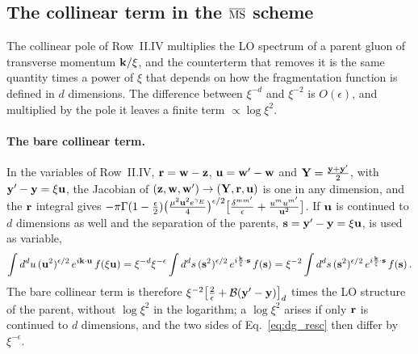 \subsection{The collinear term in the \texorpdfstring{$\overline{\rm MS}$}{MS-bar} scheme}\label{sec:dg_msbar}

The collinear pole of Row~II.IV multiplies the LO spectrum of a parent gluon of transverse momentum $\mathbf{k}/\xi$, and the counterterm that removes it is the same quantity times a power of $\xi$ that depends on how the fragmentation function is defined in $d$ dimensions. The difference between $\xi^{-d}$ and $\xi^{-2}$ is $O(\epsilon)$, and multiplied by the pole it leaves a finite term $\propto\log\xi^2$.

\paragraph{The bare collinear term.} In the variables of Row~II.IV, $\mathbf{r}=\mathbf{w}-\mathbf{z}$, $\mathbf{u}=\mathbf{w}'-\mathbf{w}$ and $\mathbf{Y}=\frac{\mathbf{y}+\mathbf{y}'}{2}$, with $\mathbf{y}'-\mathbf{y}=\xi\mathbf{u}$, the Jacobian of $(\mathbf{z},\mathbf{w},\mathbf{w}')\to(\mathbf{Y},\mathbf{r},\mathbf{u})$ is one in any dimension, and the $\mathbf{r}$ integral gives $-\pi\Gamma(1-\frac\epsilon2)\big(\frac{\mu^2\mathbf{u}^2e^{\gamma_E}}{4}\big)^{\epsilon/2}\big[\frac{\delta^{mm'}}{\epsilon}+\frac{u^mu^{m'}}{\mathbf{u}^2}\big]$. If $\mathbf{u}$ is continued to $d$ dimensions as well and the separation of the parents, $\mathbf{s}=\mathbf{y}'-\mathbf{y}=\xi\mathbf{u}$, is used as variable,
\begin{align}\label{eq:dg_resc}
\int d^du\,(\mathbf{u}^2)^{\epsilon/2}\,e^{i\mathbf{k}\cdot\mathbf{u}}\,f(\xi\mathbf{u})=\xi^{-d}\xi^{-\epsilon}\int d^ds\,(\mathbf{s}^2)^{\epsilon/2}\,e^{i\frac{\mathbf{k}}{\xi}\cdot\mathbf{s}}\,f(\mathbf{s})=\xi^{-2}\int d^ds\,(\mathbf{s}^2)^{\epsilon/2}\,e^{i\frac{\mathbf{k}}{\xi}\cdot\mathbf{s}}\,f(\mathbf{s})\,.
\end{align}
The bare collinear term is therefore $\xi^{-2}\big[\frac2\epsilon+\mathcal B(\mathbf{y}'-\mathbf{y})\big]_d$ times the LO structure of the parent, without $\log\xi^2$ in the logarithm; a $\log\xi^2$ arises if only $\mathbf{r}$ is continued to $d$ dimensions, and the two sides of Eq.~\eqref{eq:dg_resc} then differ by $\xi^{-\epsilon}$.

